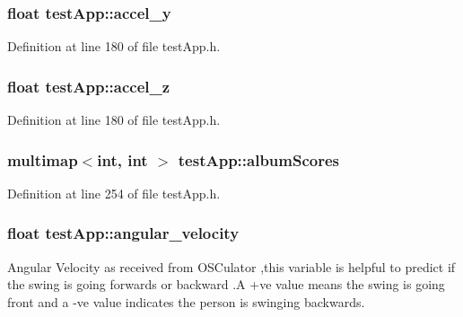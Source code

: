 \hypertarget{classtest_app_a204bcb2412a70a65ebea6008ee8c4eb0}{
\subsubsection[{accel\-\_\-y}]{\setlength{\rightskip}{0pt plus 5cm}float test\-App\-::accel\-\_\-y}}\label{classtest_app_a204bcb2412a70a65ebea6008ee8c4eb0}


Definition at line 180 of file test\-App.\-h.

\hypertarget{classtest_app_a61dbdd5c0b868568dde40a52f6e56054}{
\subsubsection[{accel\-\_\-z}]{\setlength{\rightskip}{0pt plus 5cm}float test\-App\-::accel\-\_\-z}}\label{classtest_app_a61dbdd5c0b868568dde40a52f6e56054}


Definition at line 180 of file test\-App.\-h.

\hypertarget{classtest_app_aa16e3bba73f9adb3c6363ac429e5a472}{
\subsubsection[{album\-Scores}]{\setlength{\rightskip}{0pt plus 5cm}multimap$<$int, int $>$ test\-App\-::album\-Scores}}\label{classtest_app_aa16e3bba73f9adb3c6363ac429e5a472}


Definition at line 254 of file test\-App.\-h.

\hypertarget{classtest_app_a98e05c3206ff95fccfebfc9df5317598}{
\subsubsection[{angular\-\_\-velocity}]{\setlength{\rightskip}{0pt plus 5cm}float test\-App\-::angular\-\_\-velocity}}\label{classtest_app_a98e05c3206ff95fccfebfc9df5317598}


Angular Velocity as received from O\-S\-Culator ,this variable is helpful to predict if the swing is going forwards or backward .A +ve value means the swing is going front and a -\/ve value indicates the person is swinging backwards. 



